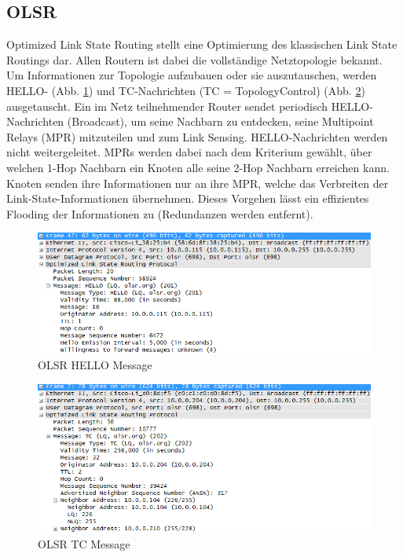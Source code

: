 \documentclass[10pt]{scrartcl}
\begin{document}
	\subsection{OLSR}
    Optimized Link State Routing stellt eine Optimierung des klassischen Link State Routings dar. Allen Routern ist dabei die vollständige Netztopologie bekannt. Um Informationen zur Topologie aufzubauen oder sie auszutauschen, werden HELLO- (Abb. \ref{img:olsr_hello_message}) und TC-Nachrichten (TC = TopologyControl) (Abb. \ref{img:olsr_tc_message}) ausgetauscht. Ein im Netz teilnehmender Router sendet periodisch HELLO-Nachrichten (Broadcast), um seine Nachbarn zu entdecken, seine Multipoint Relays (MPR) mitzuteilen und zum Link Sensing. HELLO-Nachrichten werden nicht weitergeleitet. MPRs werden dabei nach dem Kriterium gewählt, über welchen 1-Hop Nachbarn ein Knoten alle seine 2-Hop Nachbarn erreichen kann.
Knoten senden ihre Informationen nur an ihre MPR, welche das Verbreiten der Link-State-Informationen übernehmen. Dieses Vorgehen lässt ein effizientes Flooding der Informationen zu (Redundanzen werden entfernt).

	\begin{figure}[H]
        \centering
                \includegraphics[width=\textwidth]{img/olsr_hello_message_example}
        \caption{OLSR HELLO Message}
        \label{img:olsr_hello_message}
	\end{figure}
	
	
	\begin{figure}[H]
        \centering
                \includegraphics[width=\textwidth]{img/olsr_tc_message_example}
        \caption{OLSR TC Message}
        \label{img:olsr_tc_message}
	\end{figure}
	
\end{document}
